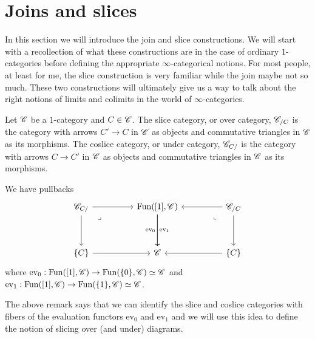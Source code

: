 \documentclass[../../thesis.tex]{subfiles}
\begin{document}
\section{Joins and slices}
In this section we will introduce the join and slice constructions.
We will start with a recollection of what these constructions are in the case of ordinary $1$-categories before defining the appropriate $\infty$-categorical notions.
For most people, at least for me, the slice construction is very familiar while the join maybe not so much.
These two constructions will ultimately give us a way to talk about the right notions of limits and colimits in the world of $\infty$-categories.
\begin{definition}\label{sliceobj}
    Let $\mathscr{C}$ be a $1$-category and $C\in \mathscr{C}$.
    The slice category, or over category, $\mathscr{C}_{/C}$ is the category with arrows $C'\to C$ in $\mathscr{C}$ as objects and commutative triangles in $\mathscr{C}$ as its morphisms.
    The coslice category, or under category, $\mathscr{C}_{C/}$ is the category with arrows $C\to C'$ in $\mathscr{C}$ as objects and commutative triangles in $\mathscr{C}$ as its morphisms.
\end{definition}
\begin{remark}
    We have pullbacks
    \[\begin{tikzcd}
            {\C_{C/}} && {\Fun([1],\C)} && {\C_{/C}} \\
            \\
            {\{C\}} && \C && {\{C\}}
            \arrow[from=3-1, to=3-3]
            \arrow[from=1-1, to=3-1]
            \arrow[from=1-1, to=1-3]
            \arrow["{\mathrm{ev}_0}"', from=1-3, to=3-3]
            \arrow[from=1-5, to=1-3]
            \arrow[from=1-5, to=3-5]
            \arrow[from=3-5, to=3-3]
            \arrow["{\mathrm{ev}_1}", from=1-3, to=3-3]
            \arrow["\lrcorner"{anchor=center, pos=0.125, rotate=-90}, draw=none, from=1-5, to=3-3]
            \arrow["\lrcorner"{anchor=center, pos=0.125}, draw=none, from=1-1, to=3-3]
        \end{tikzcd}\]
    where $\mathrm{ev}_0:\mathrm{Fun}([1],\mathscr{C}) \to \mathrm{Fun}(\{0\}, \mathscr{C}) \simeq \mathscr{C}$ and $\mathrm{ev}_1:\mathrm{Fun}([1],\mathscr{C}) \to \mathrm{Fun}(\{1\}, \mathscr{C}) \simeq \mathscr{C}$.
\end{remark}
The above remark says that we can identify the slice and coslice categories with fibers of the evaluation functors $\mathrm{ev}_0$ and $\mathrm{ev}_1$ and we will use this idea to define the notion of slicing over (and under) diagrams.
\end{document}
